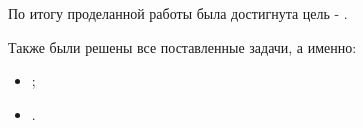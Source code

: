 По итогу проделанной работы была достигнута цель - .

Также были решены все поставленные задачи, а именно:

\begin{itemize}
	\item ;
	\item .
\end{itemize}